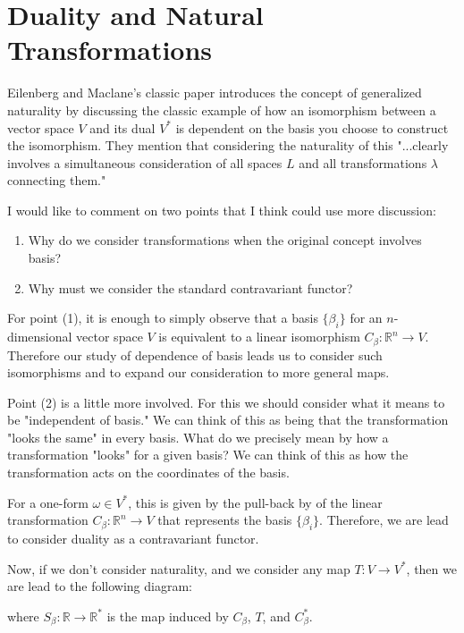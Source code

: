 \section{Duality and Natural Transformations}

Eilenberg and Maclane's classic paper introduces the concept of generalized naturality by discussing 
the classic example of how an isomorphism between a vector space \(V\) and its dual \(V^*\) is dependent on
the basis you choose to construct the isomorphism. They mention that considering the naturality of this 
"...clearly involves a simultaneous consideration of all spaces \(L\) and all transformations \(\lambda\)
connecting them."

I would like to comment on two points that I think could use more discussion:
\begin{enumerate}
\item Why do we consider transformations when the original concept involves basis?
\item Why must we consider the standard contravariant functor?
\end{enumerate}

For point (1), it is enough to simply observe that a basis \(\{\beta_i\}\) for an \(n\)-dimensional vector space \(V\) is
equivalent to a linear isomorphism \(C_\beta: \mathbb R^n \to V\). Therefore our study of dependence of basis
leads us to consider such isomorphisms and to expand our consideration to more general maps.

Point (2) is a little more involved. For this we should consider what it means to be "independent of basis." We
can think of this as being that the transformation "looks the same" in every basis. What do we precisely mean
by how a transformation "looks" for a given basis? We can think of this as how the transformation acts
on the coordinates of the basis. 

For a one-form \(\omega \in V^*\), this is given by the pull-back by of the linear transformation
\(C_\beta: \mathbb R^n  \to V\) that represents the basis \(\{\beta_i\}\). Therefore, we are lead to
consider duality as a contravariant functor.  

Now, if we don't consider naturality, and we consider any map \(T: V \to V^*\), then we are lead to the following
diagram:
\begin{figure}[h]
\centering
{}
\end{figure}
where \(S_\beta : \mathbb R \to \mathbb R^*\) is the map induced by \(C_\beta\), \(T\), and \(C_\beta^*\).

